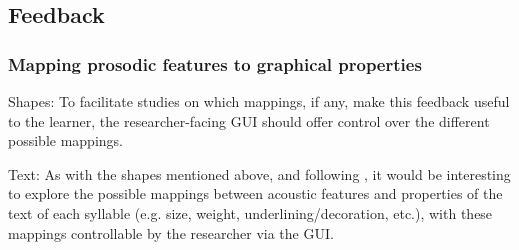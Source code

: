 %	
	 
%	 
%	 
	
	\TODO{------------------------------------}


	\subsection{Feedback}
	
	\subsubsection{Mapping prosodic features to graphical properties}
	Shapes: To facilitate studies on which mappings, if any, make this feedback useful to the learner, the researcher-facing GUI should offer control over the different possible mappings.
	
	Text: As with the shapes mentioned above, and following \textcite{Sitaram2011}, it would be interesting to explore the possible mappings between acoustic features and properties of the text of each syllable (e.g. size, weight, underlining/decoration, etc.), with these mappings controllable by the researcher via the GUI.
	
